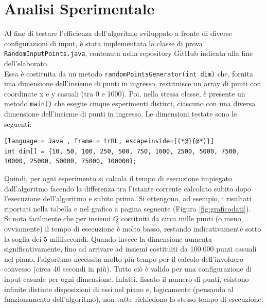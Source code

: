 \documentclass[12pt,a4paper]{report}
\begin{document}
\section{Analisi Sperimentale}\label{ch:sperimentale}
Al fine di testare l'efficienza dell'algoritmo sviluppato a fronte di diverse configurazioni di input, è stata implementata la classe di prova \texttt{RandomInputPoints.java}, contenuta nella repository GitHub indicata alla fine dell'elaborato.\\

Essa è costituita da un metodo \texttt{randomPointsGenerator(int dim)} che, fornita una dimensione dell'insieme di punti in ingresso, restituisce un array di punti con coordinate x e y casuali (tra 0 e 1000). Poi, nella stessa classe, è presente un metodo \texttt{main()} che esegue cinque esperimenti distinti, ciascuno con una diversa dimensione dell'insieme di punti in ingresso. Le dimensioni testate sono le seguenti:\\

\begin{lstlisting}[language = Java , frame = trBL, escapeinside={(*@}{@*)}]
int dim[] = {10, 50, 100, 250, 500, 750, 1000, 2500, 5000, 7500, 10000, 25000, 50000, 75000, 100000};
\end{lstlisting}

\vspace{5mm}

Quindi, per ogni esperimento si calcola il tempo di esecuzione impiegato dall'algoritmo facendo la differenza tra l'istante corrente calcolato subito dopo l'esecuzione dell'algoritmo e subito prima. Si ottengono, ad esempio, i risultati riportati nella tabella e nel grafico a pagina seguente (Figura \ref{fig:graficodati}).\\

Si nota facilmente che per insiemi $Q$ costituiti da circa mille punti (o meno, ovviamente) il tempo di esecuzione è molto basso, restando indicativamente sotto la soglia dei 5 millisecondi. Quando invece la dimensione aumenta significativamente, fino ad arrivare ad insiemi costituiti da 100.000 punti casuali nel piano, l'algoritmo necessita molto più tempo per il calcolo dell'involucro convesso (circa 40 secondi in più). Tutto ciò è valido per una configurazione di input casuale per ogni dimensione. Infatti, fissato il numero di punti, esistono infinite distinte disposizioni di essi nel piano e, logicamente (pensando al funzionamento dell'algoritmo), non tutte richiedono lo stesso tempo di esecuzione.
\end{document}
